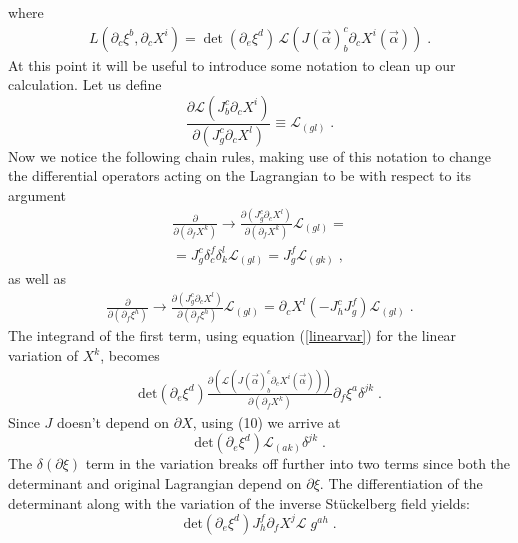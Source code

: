 \documentclass[%
 reprint,
 amsmath,amssymb,
 aps,
]{revtex4-1}
\begin{document}
where
\begin{eqnarray}
    L(\partial_c \xi^b, \partial_c X^i) = \mathrm{\det}( \partial_e \xi^d )
    \, \mathcal{L}( J(\vec{\alpha})^c_b \partial_c X^i(\vec{\alpha}) )\;.  \nonumber
\end{eqnarray}
At this point it will be useful to introduce some notation to clean up our calculation.  Let us define
\begin{equation}
    \frac{\partial \mathcal{L}(J^c_b \partial_c X^i)}{\partial (J^c_g \partial_c X^l)} \equiv \mathcal{L}_{(g l)} \; . \nonumber
\end{equation}
Now we notice the following chain rules, making use of this notation to change the differential operators acting
on the Lagrangian to be with respect to its argument
\begin{gather}
    \frac{\partial}{\partial(\partial_f X^k)} \rightarrow
    \frac{\partial(J^c_g \partial_c X^l)}{\partial (\partial_f X^k)}
    \mathcal{L}_{(g l)} = \nonumber \\
    = J^c_g \delta^f_c \delta^l_k \mathcal{L}_{(g l)}= J^f_g \mathcal{L}_{(g k)} \; ,
\end{gather}
as well as
\begin{gather}
\label{chainrulexi}
    \frac{\partial}{\partial (\partial_f \xi^h)} \rightarrow
    \frac{\partial (J^c_g \partial_c X^l)}{\partial (\partial_f \xi^h)} \mathcal{L}_{(g l)}
    = \partial_c X^l (-J^c_h J^f_g)  \mathcal{L}_{(g l)} \; .
\end{gather}
The integrand of the first term, using equation (\ref{linearvar}) for
the linear variation of $X^k$, becomes
\begin{eqnarray}
    \mathrm{det}(\partial_e \xi^d)
    \frac{\partial \left(
    \mathcal{L}( J(\vec{\alpha})^c_b \partial_c X^i(\vec{\alpha}) )
    \right)}{\partial \left(  \partial_f X^k \right)} \partial_f \xi^a \delta^{j k} \; . \nonumber
\end{eqnarray}
Since $J$ doesn't depend on $\partial X$, using (10) we arrive at
\begin{equation}
\label{term1}
    \mathrm{det} ( \partial_e \xi^d ) \mathcal{L}_{(a k)} \delta^{j k} \; .
\end{equation}
The $\delta (\partial\xi)$ term in the variation breaks off further into two terms since both the determinant and original
Lagrangian depend on $\partial \xi$. The differentiation of the determinant along with the variation of the inverse
St\"uckelberg field yields:
\begin{equation}
\label{term2}
    \mathrm{det} ( \partial_e \xi^d ) J^f_h \partial_f X^j \mathcal{L} \; g^{a h} \; .
\end{equation}
\end{document}
